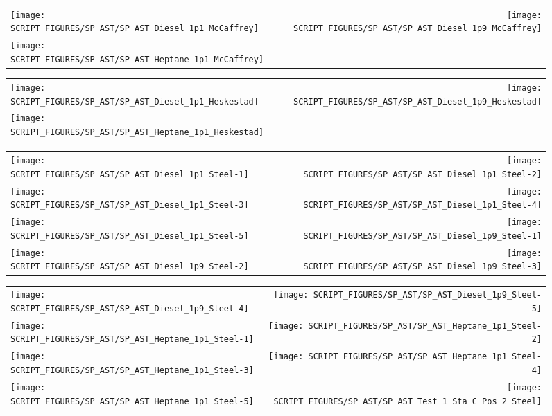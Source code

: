 \begin{figure}[p]
\begin{tabular*}{\textwidth}{l@{\extracolsep{\fill}}r}
\texttt{[image: SCRIPT\_FIGURES/SP\_AST/SP\_AST\_Diesel\_1p1\_McCaffrey]} &
\texttt{[image: SCRIPT\_FIGURES/SP\_AST/SP\_AST\_Diesel\_1p9\_McCaffrey]} \\
\texttt{[image: SCRIPT\_FIGURES/SP\_AST/SP\_AST\_Heptane\_1p1\_McCaffrey]}
\end{tabular*}
\end{figure}

\begin{figure}[p]
\begin{tabular*}{\textwidth}{l@{\extracolsep{\fill}}r}
\texttt{[image: SCRIPT\_FIGURES/SP\_AST/SP\_AST\_Diesel\_1p1\_Heskestad]} &
\texttt{[image: SCRIPT\_FIGURES/SP\_AST/SP\_AST\_Diesel\_1p9\_Heskestad]} \\
\texttt{[image: SCRIPT\_FIGURES/SP\_AST/SP\_AST\_Heptane\_1p1\_Heskestad]}
\end{tabular*}
\end{figure}

\begin{figure}[p]
\begin{tabular*}{\textwidth}{l@{\extracolsep{\fill}}r}
\texttt{[image: SCRIPT\_FIGURES/SP\_AST/SP\_AST\_Diesel\_1p1\_Steel-1]} &
\texttt{[image: SCRIPT\_FIGURES/SP\_AST/SP\_AST\_Diesel\_1p1\_Steel-2]} \\
\texttt{[image: SCRIPT\_FIGURES/SP\_AST/SP\_AST\_Diesel\_1p1\_Steel-3]} &
\texttt{[image: SCRIPT\_FIGURES/SP\_AST/SP\_AST\_Diesel\_1p1\_Steel-4]} \\
\texttt{[image: SCRIPT\_FIGURES/SP\_AST/SP\_AST\_Diesel\_1p1\_Steel-5]} &
\texttt{[image: SCRIPT\_FIGURES/SP\_AST/SP\_AST\_Diesel\_1p9\_Steel-1]} \\
\texttt{[image: SCRIPT\_FIGURES/SP\_AST/SP\_AST\_Diesel\_1p9\_Steel-2]} &
\texttt{[image: SCRIPT\_FIGURES/SP\_AST/SP\_AST\_Diesel\_1p9\_Steel-3]}
\end{tabular*}
\end{figure}

\begin{figure}[p]
\begin{tabular*}{\textwidth}{l@{\extracolsep{\fill}}r}
\texttt{[image: SCRIPT\_FIGURES/SP\_AST/SP\_AST\_Diesel\_1p9\_Steel-4]} &
\texttt{[image: SCRIPT\_FIGURES/SP\_AST/SP\_AST\_Diesel\_1p9\_Steel-5]} \\
\texttt{[image: SCRIPT\_FIGURES/SP\_AST/SP\_AST\_Heptane\_1p1\_Steel-1]} &
\texttt{[image: SCRIPT\_FIGURES/SP\_AST/SP\_AST\_Heptane\_1p1\_Steel-2]} \\
\texttt{[image: SCRIPT\_FIGURES/SP\_AST/SP\_AST\_Heptane\_1p1\_Steel-3]} &
\texttt{[image: SCRIPT\_FIGURES/SP\_AST/SP\_AST\_Heptane\_1p1\_Steel-4]} \\
\texttt{[image: SCRIPT\_FIGURES/SP\_AST/SP\_AST\_Heptane\_1p1\_Steel-5]} &
\texttt{[image: SCRIPT\_FIGURES/SP\_AST/SP\_AST\_Test\_1\_Sta\_C\_Pos\_2\_Steel]}
\end{tabular*}
\end{figure}

